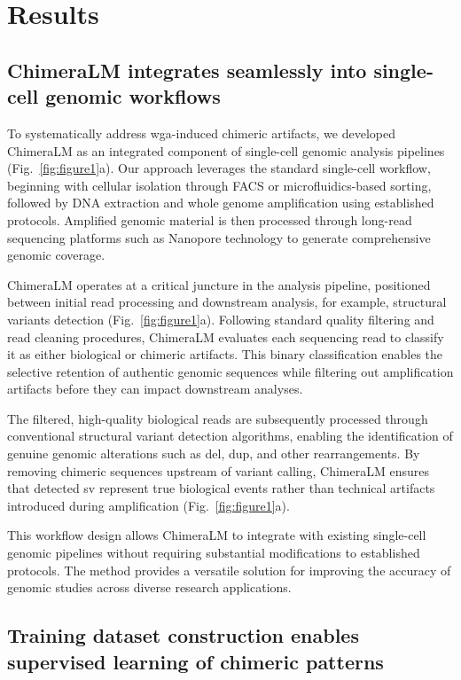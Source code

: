 \documentclass[pdflatex,sn-nature]{sn-jnl}%
\theoremstyle{thmstyleone}%
\theoremstyle{thmstyletwo}%
\theoremstyle{thmstylethree}%
\begin{document}
\section*{Results}\label{sec:results}

\subsection*{ChimeraLM integrates seamlessly into single-cell genomic workflows}

To systematically address \gls{wga}-induced chimeric artifacts, we developed ChimeraLM as an integrated component of single-cell genomic analysis pipelines (Fig.~\ref{fig:figure1}a).
Our approach leverages the standard single-cell workflow, beginning with cellular isolation through FACS or microfluidics-based sorting, followed by DNA extraction and whole genome amplification using established protocols.
Amplified genomic material is then processed through long-read sequencing platforms such as Nanopore technology to generate comprehensive genomic coverage.

ChimeraLM operates at a critical juncture in the analysis pipeline, positioned between initial read processing and downstream analysis, for example, structural variants detection (Fig.~\ref{fig:figure1}a).
Following standard quality filtering and read cleaning procedures, ChimeraLM evaluates each sequencing read to classify it as either biological or chimeric artifacts.
This binary classification enables the selective retention of authentic genomic sequences while filtering out amplification artifacts before they can impact downstream analyses.

The filtered, high-quality biological reads are subsequently processed through conventional structural variant detection algorithms, enabling the identification of genuine genomic alterations such as \gls{del}, \gls{dup}, and other rearrangements.
By removing chimeric sequences upstream of variant calling, ChimeraLM ensures that detected \gls{sv} represent true biological events rather than technical artifacts introduced during amplification (Fig.~\ref{fig:figure1}a).

This workflow design allows ChimeraLM to integrate with existing single-cell genomic pipelines without requiring substantial modifications to established protocols.
The method provides a versatile solution for improving the accuracy of genomic studies across diverse research applications.

\subsection*{Training dataset construction enables supervised learning of chimeric patterns}
\end{document}
